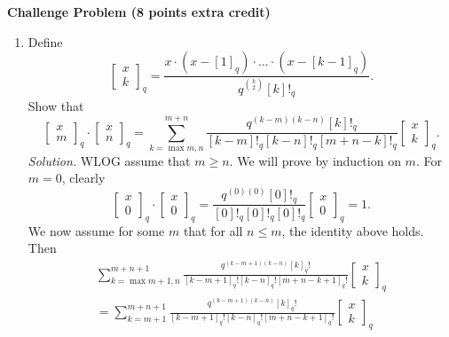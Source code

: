 \documentclass[11pt,letterpaper,dvipsnames]{article}
\newcommand{\qbin}[2]{\begin{bmatrix}{#1}\\ {#2}\end{bmatrix}_q}
\newenvironment{solution}{\color{Violet}\textit{Solution.}}{\color{black}}
\begin{document}
\textbf{Challenge Problem (8 points extra credit)}
\begin{enumerate}
\item Define
\[
\qbin{x}{k} = \frac{x\cdot \left(x - [1]_q\right) \cdot \ldots \cdot \left(x - [k-
1]_q\right)}{q^{\binom{k}{2}} [k]!_q }.
\]
Show that
\[
\qbin{x}{m}\cdot \qbin{x}{n} = \sum_{k = \max{m,n}}^{m+n} \frac{q^{(k-m)(k-n)} [k]!
_q}{[k-m]!_q [k-n]!_q [m+n-k]!_q } \qbin{x}{k}.
\]
\begin{solution}
	WLOG assume that $m\geq n$. We will prove by induction on $m$. For $m=0$, clearly
	\[
		\qbin{x}{0}\cdot \qbin{x}{0} = \frac{q^{(0)(0)} [0]!
_q}{[0]!_q [0]!_q [0]!_q } \qbin{x}{0}=1.
	\]
	We now assume for some $m$ that for all $n\leq m$, the identity above holds. Then
	\begin{align*}
		\sum_{k = \max{m+1,n}}^{m+n+1} \frac{q^{(k-m+1)(k-n)} [k]_q!
}{[k-m+1]_q! [k-n]_q! [m+n-k+1]_q! } \qbin{x}{k} \\
= \sum_{k = m+1}^{m+n+1} \frac{q^{(k-m+1)(k-n)} [k]_q!
}{[k-m+1]_q! [k-n]_q! [m+n-k+1]_q! } \qbin{x}{k}
	\end{align*}
\end{solution}

\end{enumerate}
\end{document}
